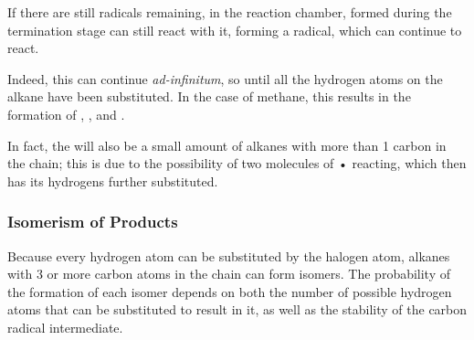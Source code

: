 				If there are still \ch{\chlorine} radicals remaining, in the reaction chamber,  formed during the
				termination stage can still react with it, forming a  radical, which can continue to react.


				Indeed, this can continue \textit{ad-infinitum}, so until all the hydrogen atoms on the alkane have been substituted.
				In the case of methane, this results in the formation of , ,  and
				.

				In fact, the will also be a small amount of alkanes with more than 1 carbon in the chain; this is due to the
				possibility of two molecules of • reacting, which then has its hydrogens further substituted.





			\pagebreak
			\subsubsection{Isomerism of Products}

				Because every hydrogen atom can be substituted by the halogen atom, alkanes with 3 or more carbon atoms in the chain
				can form isomers. The probability of the formation of each isomer depends on both the number of possible hydrogen atoms
				that can be substituted to result in it, as well as the stability of the carbon radical intermediate.


